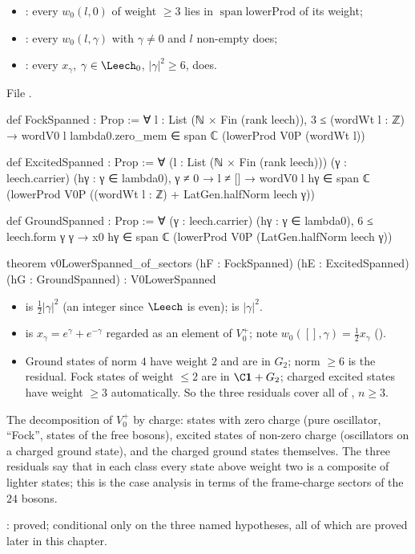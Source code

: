 \begin{definition}\label{ch12:def:sectors}
\begin{itemize}
\item {}: every $w_0(l,0)$ of weight $\ge3$ lies in $\operatorname{span}\mathrm{lowerProd}$ of its weight;
\item {}: every $w_0(l,\gamma)$ with $\gamma\neq0$ and $l$ non-empty does;
\item {}: every $x_\gamma$, $\gamma\in\Leech_0$, $|\gamma|^2\ge6$, does.
\end{itemize}
\end{definition}
File .
\begin{leancode}
def FockSpanned : Prop :=
  ∀ l : List (ℕ × Fin (rank leech)), 3 ≤ (wordWt l : ℤ) →
    wordV0 l lambda0.zero_mem ∈ span ℂ (lowerProd V0P (wordWt l))

def ExcitedSpanned : Prop :=
  ∀ (l : List (ℕ × Fin (rank leech))) (γ : leech.carrier) (hγ : γ ∈ lambda0), γ ≠ 0 → l ≠ [] →
    wordV0 l hγ ∈ span ℂ (lowerProd V0P ((wordWt l : ℤ) + LatGen.halfNorm leech γ))

def GroundSpanned : Prop :=
  ∀ (γ : leech.carrier) (hγ : γ ∈ lambda0), 6 ≤ leech.form γ γ →
    x0 hγ ∈ span ℂ (lowerProd V0P (LatGen.halfNorm leech γ))

theorem v0LowerSpanned_of_sectors (hF : FockSpanned) (hE : ExcitedSpanned) (hG : GroundSpanned) :
    V0LowerSpanned
\end{leancode}
\begin{dictionary}
\begin{itemize}
\item {} is $\tfrac12|\gamma|^2$ (an integer since $\Leech$ is even);
   is $|\gamma|^2$.
\item {} is $x_\gamma=e^\gamma+e^{-\gamma}$ regarded as an element of $V_0^+$; note
  $w_0([],\gamma)=\tfrac12x_\gamma$ ().
\item Ground states of norm $4$ have weight $2$ and are in $G_2$; norm $\ge6$ is the residual.  Fock
  states of weight $\le2$ are in $\C\mathbf 1+G_2$; charged excited states have weight $\ge3$
  automatically.  So the three residuals cover all of , $n\ge3$.
\end{itemize}
\end{dictionary}

\begin{physics}
The decomposition of $V_0^+$ by charge: states with zero charge (pure oscillator, ``Fock'', states of the free bosons), excited states of non-zero charge (oscillators on a charged ground state), and the charged ground states themselves. The three residuals say that in each class every state above weight two is a composite of lighter states; this is the case analysis in terms of the frame-charge sectors of the $24$ bosons.
\end{physics}
\begin{status}: proved; conditional only on the three named
hypotheses, all of which are proved later in this chapter.\end{status}

